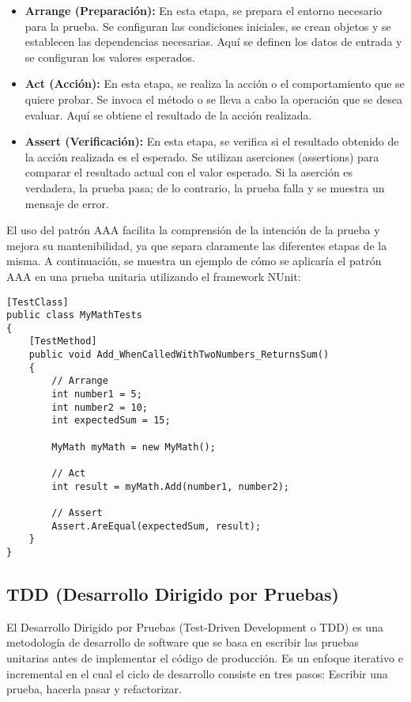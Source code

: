 \documentclass[executivepaper]{article}
\begin{document}
\begin{itemize}
    \item \textbf{Arrange (Preparación):} En esta etapa, se prepara el entorno necesario para la prueba. Se configuran las condiciones iniciales, se crean objetos y se establecen las dependencias necesarias. Aquí se definen los datos de entrada y se configuran los valores esperados.
    \item \textbf{Act (Acción):} En esta etapa, se realiza la acción o el comportamiento que se quiere probar. Se invoca el método o se lleva a cabo la operación que se desea evaluar. Aquí se obtiene el resultado de la acción realizada.
    \item \textbf{Assert (Verificación):} En esta etapa, se verifica si el resultado obtenido de la acción realizada es el esperado. Se utilizan aserciones (assertions) para comparar el resultado actual con el valor esperado. Si la aserción es verdadera, la prueba pasa; de lo contrario, la prueba falla y se muestra un mensaje de error.
\end{itemize}
El uso del patrón AAA facilita la comprensión de la intención de la prueba y mejora su mantenibilidad, ya que separa claramente las diferentes etapas de la misma. A continuación, se muestra un ejemplo de cómo se aplicaría el patrón AAA en una prueba unitaria utilizando el framework NUnit:    

\begin{lstlisting}
[TestClass]
public class MyMathTests
{
    [TestMethod]
    public void Add_WhenCalledWithTwoNumbers_ReturnsSum()
    {
        // Arrange
        int number1 = 5;
        int number2 = 10;
        int expectedSum = 15;
        
        MyMath myMath = new MyMath();
        
        // Act
        int result = myMath.Add(number1, number2);
        
        // Assert
        Assert.AreEqual(expectedSum, result);
    }
}

\end{lstlisting}

\subsection{TDD (Desarrollo Dirigido por Pruebas)}

El Desarrollo Dirigido por Pruebas (Test-Driven Development o TDD) es una metodología de desarrollo de software que se basa en escribir las pruebas unitarias antes de implementar el código de producción. Es un enfoque iterativo e incremental en el cual el ciclo de desarrollo consiste en tres pasos: Escribir una prueba, hacerla pasar y refactorizar.
\end{document}
